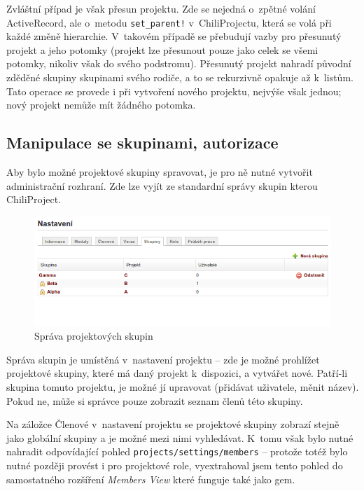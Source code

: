 \documentclass[thesis=B,czech]{FITthesis}[2012/05/02]
\begin{document}
Zvláštní případ je však přesun projektu. Zde se nejedná o~zpětné volání
ActiveRecord, ale o~metodu \lstinline"set_parent!" v~ChiliProjectu,
která se volá při každé změně hierarchie. V~takovém případě se přebudují
vazby pro přesunutý projekt a jeho potomky (projekt lze přesunout pouze
jako celek se všemi potomky, nikoliv však do svého podstromu). Přesunutý
projekt nahradí původní zděděné skupiny skupinami svého rodiče, a to se
rekurzivně opakuje až k~listům.
Tato operace se provede i při vytvoření nového projektu, nejvýše však
jednou; nový projekt nemůže mít žádného potomka.

\subsection{Manipulace se skupinami, autorizace}

Aby bylo možné projektové skupiny spravovat, je pro ně nutné vytvořit
administrační rozhraní. Zde lze vyjít ze standardní správy skupin kterou
ChiliProject.

\begin{figure}[tbp]
\centering
\includegraphics[width=1\textwidth]{group-gui1.png}
\caption{Správa projektových skupin}
\end{figure}

Správa skupin je umístěná v~nastavení projektu -- zde je možné prohlížet
projektové skupiny, které má daný projekt k~dispozici, a vytvářet nové.
Patří-li skupina tomuto projektu, je možné jí upravovat (přidávat
uživatele, měnit název). Pokud ne, může si správce pouze zobrazit seznam
členů této skupiny.

Na záložce Členové v~nastavení projektu se projektové skupiny zobrazí
stejně jako globální skupiny a je možné mezi nimi vyhledávat. K~tomu
však bylo nutné nahradit odpovídající pohled
\lstinline!projects/settings/members! -- protože totéž bylo nutné
později provést i pro projektové role, vyextrahoval jsem tento pohled do
samostatného rozšíření \emph{Members View}
které funguje také jako \gls{gem}.
\end{document}
